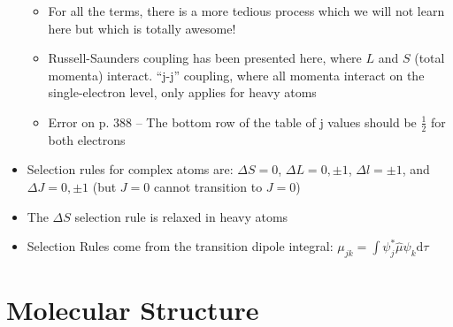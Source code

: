 \documentclass[12pt, openany, letterpaper]{memoir}
\begin{document}
\begin{itemize}
\begin{itemize}
		\item For all the terms, there is a more tedious process which we will not learn here but which is totally awesome!
		\item Russell-Saunders coupling has been presented here, where $L$ and $S$ (total momenta) interact. “j-j” coupling, where all momenta interact on the single-electron level, only applies for heavy atoms
		\item Error on p. 388 -- The bottom row of the table of j values should be $\frac{1}{2}$ for both electrons
	\end{itemize}
	\item Selection rules for complex atoms are: $\Delta S=0$, $\Delta L=0,\pm1$, $\Delta l=\pm 1$, and $\Delta J=0,\pm1$ (but $J=0$ cannot transition to $J=0$)
	\item The $\Delta S$ selection rule is relaxed in heavy atoms
	\item Selection Rules come from the transition dipole integral: $\mu_{jk}=\displaystyle\int \psi_j^*\hat{\mu}\psi_k\mathrm{d}\tau$
\end{itemize}

\chapter{Molecular Structure}
\end{document}
